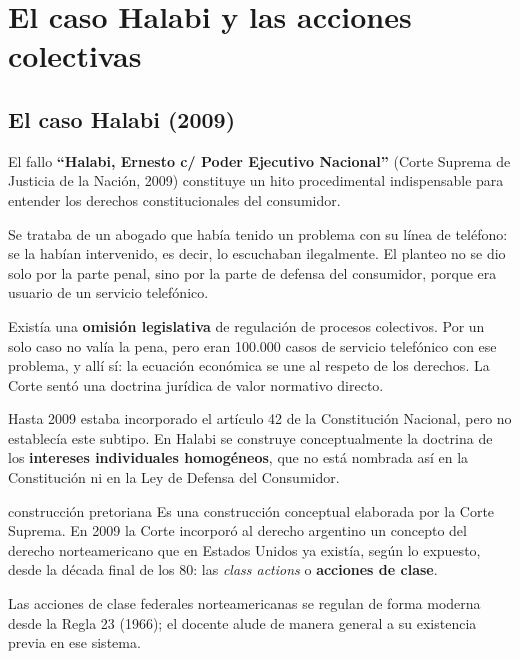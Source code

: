 \documentclass[12pt,oneside]{book}
\begin{document}
\chapter{El caso Halabi y las acciones colectivas}

\section{El caso Halabi (2009)}

El fallo \textbf{``Halabi, Ernesto c/ Poder Ejecutivo Nacional''} (Corte Suprema de Justicia de la Naci\'on, 2009) constituye un hito procedimental indispensable para entender los derechos constitucionales del consumidor.

Se trataba de un abogado que hab\'ia tenido un problema con su l\'inea de tel\'efono: se la hab\'ian intervenido, es decir, lo escuchaban ilegalmente. El planteo no se dio solo por la parte penal, sino por la parte de defensa del consumidor, porque era usuario de un servicio telef\'onico.

Exist\'ia una \textbf{omisi\'on legislativa} de regulaci\'on de procesos colectivos. Por un solo caso no val\'ia la pena, pero eran 100.000 casos de servicio telef\'onico con ese problema, y all\'i s\'i: la ecuaci\'on econ\'omica se une al respeto de los derechos. La Corte sent\'o una doctrina jur\'idica de valor normativo directo.

Hasta 2009 estaba incorporado el art\'iculo 42 de la Constituci\'on Nacional, pero no establec\'ia este subtipo. En Halabi se construye conceptualmente la doctrina de los \textbf{intereses individuales homog\'eneos}, que no est\'a nombrada as\'i en la Constituci\'on ni en la Ley de Defensa del Consumidor.

\begin{definition}{construcci\'on pretoriana}
Es una construcci\'on conceptual elaborada por la Corte Suprema. En 2009 la Corte incorpor\'o al derecho argentino un concepto del derecho norteamericano que en Estados Unidos ya exist\'ia, seg\'un lo expuesto, desde la d\'ecada final de los 80: las \emph{class actions} o \textbf{acciones de clase}.%
\end{definition}

\begin{note}
Las acciones de clase federales norteamericanas se regulan de forma moderna desde la Regla 23 (1966); el docente alude de manera general a su existencia previa en ese sistema.
\end{note}
\end{document}
